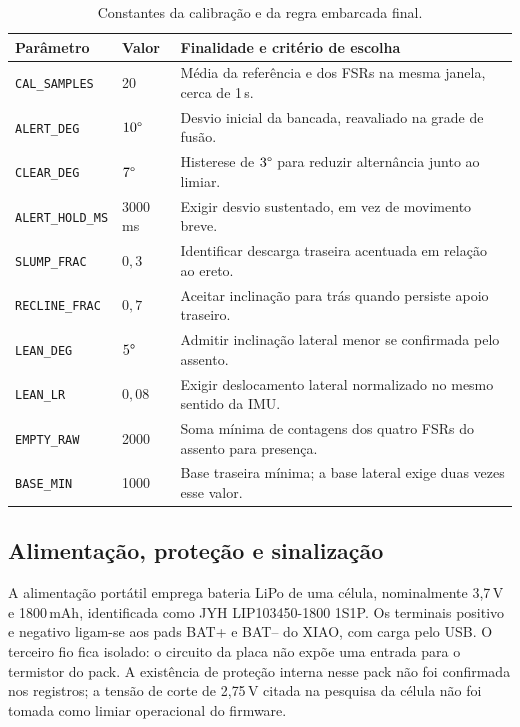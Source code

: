 \begin{table}[H]
  \centering
  \begin{singlespace}
  \caption{Constantes da calibração e da regra embarcada final.}
  \label{tab:met-constantes}
  \small
  \begin{tabularx}{\linewidth}{@{}l l X@{}}
    \toprule
    Parâmetro & Valor & Finalidade e critério de escolha \\
    \midrule
    \texttt{CAL\_SAMPLES} & 20 & Média da referência e dos FSRs na mesma janela, cerca de 1\,s. \\
    \texttt{ALERT\_DEG} & $10\degree{}$ & Desvio inicial da bancada, reavaliado na grade de fusão. \\
    \texttt{CLEAR\_DEG} & $7\degree{}$ & Histerese de $3\degree{}$ para reduzir alternância junto ao limiar. \\
    \texttt{ALERT\_HOLD\_MS} & 3000\,ms & Exigir desvio sustentado, em vez de movimento breve. \\
    \texttt{SLUMP\_FRAC} & $0{,}3$ & Identificar descarga traseira acentuada em relação ao ereto. \\
    \texttt{RECLINE\_FRAC} & $0{,}7$ & Aceitar inclinação para trás quando persiste apoio traseiro. \\
    \texttt{LEAN\_DEG} & $5\degree{}$ & Admitir inclinação lateral menor se confirmada pelo assento. \\
    \texttt{LEAN\_LR} & $0{,}08$ & Exigir deslocamento lateral normalizado no mesmo sentido da IMU. \\
    \texttt{EMPTY\_RAW} & 2000 & Soma mínima de contagens dos quatro FSRs do assento para presença. \\
    \texttt{BASE\_MIN} & 1000 & Base traseira mínima; a base lateral exige duas vezes esse valor. \\
    \bottomrule
  \end{tabularx}
  \end{singlespace}
\end{table}

\subsection{Alimentação, proteção e sinalização}
\label{sec:met-alimentacao}

A alimentação portátil emprega bateria LiPo de uma célula, nominalmente
3{,}7\,V e 1800\,mAh, identificada como JYH LIP103450-1800 1S1P.
Os terminais positivo e negativo ligam-se aos pads BAT+ e BAT-- do
XIAO, com carga pelo USB. O terceiro fio fica isolado: o circuito da
placa não expõe uma entrada para o termistor do pack. A existência de
proteção interna nesse pack não foi confirmada nos registros; a tensão
de corte de 2{,}75\,V citada na pesquisa da célula não foi tomada
como limiar operacional do firmware.

